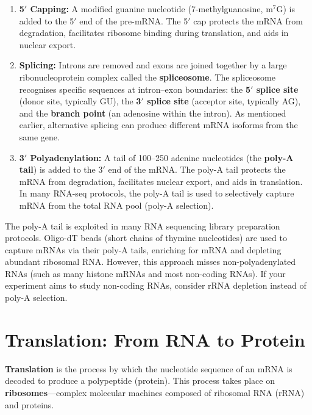 \begin{enumerate}[itemsep=3pt]
  \item \textbf{5$'${} Capping:} A modified guanine nucleotide (7-methylguanosine, m$^7$G) is added to the 5$'${} end of the pre-mRNA. The 5$'${} cap protects the mRNA from degradation, facilitates ribosome binding during translation, and aids in nuclear export.

  \item \textbf{Splicing:} Introns are removed and exons are joined together by a large ribonucleoprotein complex called the \textbf{spliceosome}. The spliceosome recognises specific sequences at intron--exon boundaries: the \textbf{5$'${} splice site} (donor site, typically GU), the \textbf{3$'${} splice site} (acceptor site, typically AG), and the \textbf{branch point} (an adenosine within the intron). As mentioned earlier, alternative splicing can produce different mRNA isoforms from the same gene.

  \item \textbf{3$'${} Polyadenylation:} A tail of 100--250 adenine nucleotides (the \textbf{poly-A tail}) is added to the 3$'${} end of the mRNA. The poly-A tail protects the mRNA from degradation, facilitates nuclear export, and aids in translation. In many \acrshort{RNA-seq} protocols, the poly-A tail is used to selectively capture mRNA from the total RNA pool (poly-A selection).
\end{enumerate}

\begin{tipbox}
The poly-A tail is exploited in many RNA sequencing library preparation protocols. Oligo-dT beads (short chains of thymine nucleotides) are used to capture mRNAs via their poly-A tails, enriching for mRNA and depleting abundant ribosomal RNA. However, this approach misses non-polyadenylated RNAs (such as many histone mRNAs and most non-coding RNAs). If your experiment aims to study non-coding RNAs, consider rRNA depletion instead of poly-A selection.
\end{tipbox}


\section{Translation: From RNA to Protein}
\label{sec:molbio:translation}

\textbf{Translation} is the process by which the nucleotide sequence of an mRNA is decoded to produce a polypeptide (protein). This process takes place on \textbf{ribosomes}---complex molecular machines composed of ribosomal RNA (rRNA) and proteins.

